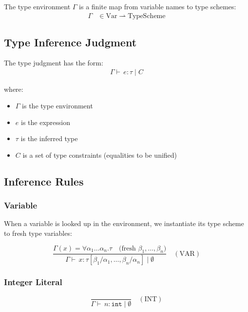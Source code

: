 \documentclass[12pt]{article}
\newcommand{\judge}[1]{\vdash \, #1}
\newcommand{\env}{\Gamma}
\newcommand{\type}{\tau}
\begin{document}
The type environment $\env$ is a finite map from variable names to type schemes:
\begin{align*}
\env &\in \text{Var} \rightharpoonup \text{TypeScheme}
\end{align*}

\subsection{Type Inference Judgment}

The type judgment has the form:
\begin{align*}
\env \judge{e : \type \mid C}
\end{align*}

where:
\begin{itemize}
  \item $\env$ is the type environment
  \item $e$ is the expression
  \item $\type$ is the inferred type
  \item $C$ is a set of type constraints (equalities to be unified)
\end{itemize}

\subsection{Inference Rules}

\subsubsection{Variable}

When a variable is looked up in the environment, we instantiate its type scheme to fresh type variables:

\begin{equation*}
\frac{
  \env(x) = \forall \alpha_1 \ldots \alpha_n . \type
  \quad
  \text{(fresh } \beta_1, \ldots, \beta_n \text{)}
}{
  \env \judge{x : \type[\beta_1/\alpha_1, \ldots, \beta_n/\alpha_n] \mid \emptyset}
}
\quad (\text{VAR})
\end{equation*}

\subsubsection{Integer Literal}

\begin{equation*}
\frac{}{\env \judge{n : \mathtt{int} \mid \emptyset}}
\quad (\text{INT})
\end{equation*}
\end{document}
